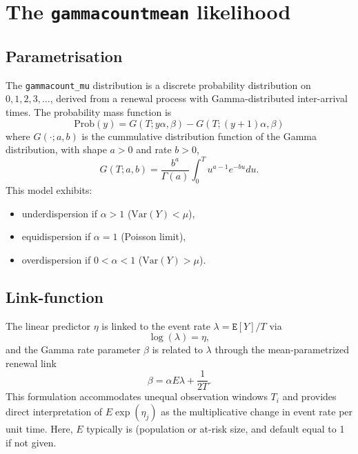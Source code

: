 \documentclass[a4paper,11pt]{article}
\begin{document}
\section*{The \texttt{gammacountmean} likelihood}

\subsection*{Parametrisation}

The \texttt{gammacount\_mu} distribution is a discrete probability
distribution on $0, 1, 2, 3, \ldots$, derived from a renewal process
with Gamma-distributed inter-arrival times. The probability mass
function is
\begin{displaymath}
    \text{Prob}(y) = G(T; y\alpha, \beta) - G(T; (y+1)\alpha, \beta)
\end{displaymath}
where $G(\cdot; a, b)$ is the cummulative distribution function of the
Gamma distribution, with shape $a>0$ and rate $b>0$,
\begin{displaymath}
    G(T; a, b) = \frac{b^a}{\Gamma(a)} \int_0^{T} u^{a-1}e^{-bu} du.
\end{displaymath}
This model exhibits:
\begin{itemize}
\item underdispersion if $\alpha > 1$ ($\mathrm{Var}(Y) < \mu$),
\item equidispersion if $\alpha = 1$ (Poisson limit),
\item overdispersion if $0 < \alpha < 1$ ($\mathrm{Var}(Y) > \mu$).
\end{itemize}

\subsection*{Link-function}

The linear predictor $\eta$ is linked to the event rate
$\lambda = {\texttt E}[Y]/T$ via
\begin{displaymath}
    \log(\lambda) = \eta,
\end{displaymath}
and the Gamma rate parameter $\beta$ is related to $\lambda$ through
the mean-parametrized renewal link
\begin{displaymath}
    \beta = \alpha E \lambda + \frac{1}{2T}.
\end{displaymath}
This formulation accommodates unequal observation windows $T_i$ and
provides direct interpretation of $E\exp(\eta_j)$ as the
multiplicative change in event rate per unit time. Here, $E$ typically
is (population or at-risk size, and default equal to 1 if not given.
\end{document}
